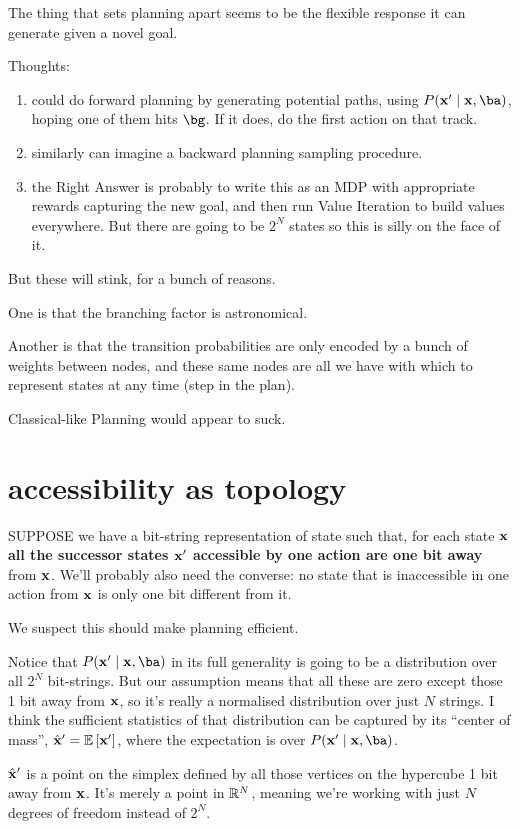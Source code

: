 \documentclass[11pt]{article}
\begin{document}
The thing that sets planning apart seems to be the flexible response it can generate given a novel goal.

Thoughts:
\begin{enumerate}
 \item could do forward planning by generating potential paths, using $P(\bx^\prime \mid \bx, \ba)$, hoping one of them hits $\bg$. If it does, do the first action on that track.
 \item similarly can imagine a backward planning sampling procedure.
 \item the Right Answer is probably to write this as an MDP with appropriate rewards capturing the new goal, and then run Value Iteration to build values everywhere. But there are going to be $2^N$ states so this is silly on the face of it.
\end{enumerate}
But these will stink, for a bunch of reasons.

One is that the branching factor is astronomical.

Another is that the transition probabilities are only encoded by a bunch of weights between nodes, and these same nodes are all we have with which to represent states at any time (step in the plan).

Classical-like Planning would appear to suck.

\section{accessibility as topology}

SUPPOSE we have a bit-string representation of state such that, for each state $\mathbf{x}$ {\bf all the successor states $\mathbf{x}^\prime$ accessible by one action are one bit away} from $\mathbf{x}$. We'll probably also need the converse: no state that is inaccessible in one action from $\mathbf{x}$ is only one bit different from it.

We suspect this should make planning efficient.

Notice that $P(\bx^\prime \mid \bx, \ba)$ in its full generality is going to be a distribution over all $2^N$ bit-strings.
But our assumption means that all these are zero except those 1 bit away from $\mathbf{x}$, so it's really a normalised distribution over just $N$ strings. I think the sufficient statistics of that distribution can be captured by its ``center of mass'', $\hat{\mathbf{x}}^\prime = \mathbb{E} \left[ \mathbf{x}^\prime \right]$, where the expectation is over $P(\bx^\prime \mid \bx, \ba)$. 

$\hat{\mathbf{x}}^\prime$ is a point on the simplex defined by all those vertices on the hypercube 1 bit away from $\mathbf{x}$. It's merely a point in $\mathbb{R}^N$, meaning we're working with just $N$ degrees of freedom instead of $2^N$.
\end{document}
